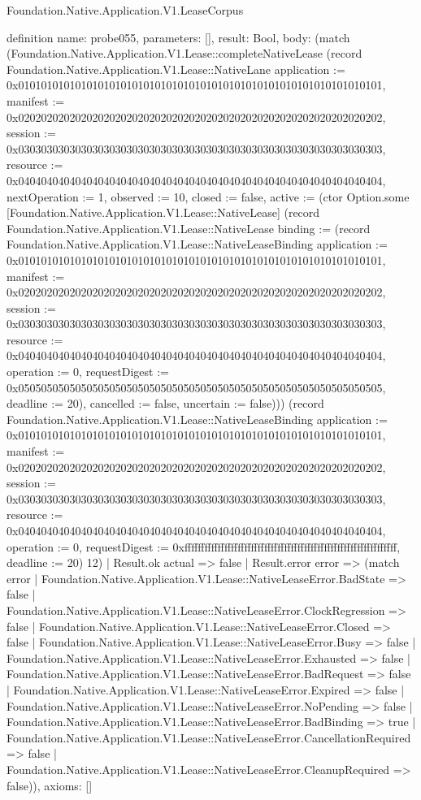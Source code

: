 \begin{lexlean}{Foundation.Native.Application.V1.LeaseCorpus}
\begin{semanticmodule}
definition{
  name: probe055,
  parameters: [],
  result: Bool,
  body: (match (Foundation.Native.Application.V1.Lease::completeNativeLease (record Foundation.Native.Application.V1.Lease::NativeLane {application := 0x0101010101010101010101010101010101010101010101010101010101010101, manifest := 0x0202020202020202020202020202020202020202020202020202020202020202, session := 0x0303030303030303030303030303030303030303030303030303030303030303, resource := 0x0404040404040404040404040404040404040404040404040404040404040404, nextOperation := 1, observed := 10, closed := false, active := (ctor Option.some [Foundation.Native.Application.V1.Lease::NativeLease] (record Foundation.Native.Application.V1.Lease::NativeLease {binding := (record Foundation.Native.Application.V1.Lease::NativeLeaseBinding {application := 0x0101010101010101010101010101010101010101010101010101010101010101, manifest := 0x0202020202020202020202020202020202020202020202020202020202020202, session := 0x0303030303030303030303030303030303030303030303030303030303030303, resource := 0x0404040404040404040404040404040404040404040404040404040404040404, operation := 0, requestDigest := 0x0505050505050505050505050505050505050505050505050505050505050505, deadline := 20}), cancelled := false, uncertain := false}))}) (record Foundation.Native.Application.V1.Lease::NativeLeaseBinding {application := 0x0101010101010101010101010101010101010101010101010101010101010101, manifest := 0x0202020202020202020202020202020202020202020202020202020202020202, session := 0x0303030303030303030303030303030303030303030303030303030303030303, resource := 0x0404040404040404040404040404040404040404040404040404040404040404, operation := 0, requestDigest := 0xffffffffffffffffffffffffffffffffffffffffffffffffffffffffffffffff, deadline := 20}) 12)
    | Result.ok actual => false
    | Result.error error => (match error
      | Foundation.Native.Application.V1.Lease::NativeLeaseError.BadState => false
      | Foundation.Native.Application.V1.Lease::NativeLeaseError.ClockRegression => false
      | Foundation.Native.Application.V1.Lease::NativeLeaseError.Closed => false
      | Foundation.Native.Application.V1.Lease::NativeLeaseError.Busy => false
      | Foundation.Native.Application.V1.Lease::NativeLeaseError.Exhausted => false
      | Foundation.Native.Application.V1.Lease::NativeLeaseError.BadRequest => false
      | Foundation.Native.Application.V1.Lease::NativeLeaseError.Expired => false
      | Foundation.Native.Application.V1.Lease::NativeLeaseError.NoPending => false
      | Foundation.Native.Application.V1.Lease::NativeLeaseError.BadBinding => true
      | Foundation.Native.Application.V1.Lease::NativeLeaseError.CancellationRequired => false
      | Foundation.Native.Application.V1.Lease::NativeLeaseError.CleanupRequired => false)),
  axioms: []
}


\end{semanticmodule}
\end{lexlean}
